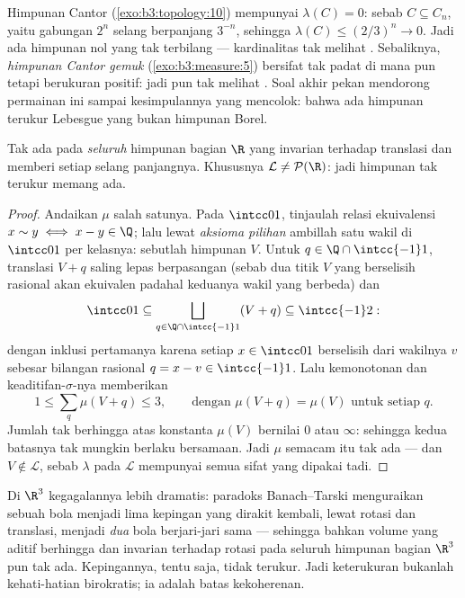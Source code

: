 \begin{example}\label{ex:b3:measure:cantor}
Himpunan Cantor (\cref{exo:b3:topology:10}) mempunyai $\lambda(C) = 0$:
sebab $C \subseteq C_n$, yaitu gabungan $2^n$ selang berpanjang
$3^{-n}$, sehingga $\lambda(C) \leq (2/3)^n \to 0$. Jadi ada himpunan nol
yang tak terbilang --- kardinalitas tak melihat . Sebaliknya,
\emph{himpunan Cantor gemuk} (\cref{exo:b3:measure:5}) bersifat tak padat
di mana pun tetapi berukuran positif: jadi  pun tak melihat .
Soal akhir pekan mendorong permainan ini sampai kesimpulannya yang
mencolok: bahwa ada himpunan terukur Lebesgue yang
bukan himpunan Borel.
\end{example}

\begin{theorem}[Vitali]\label{thm:b3:measure:vitali}
Tak ada  pada \emph{seluruh} himpunan bagian $\R$ yang
invarian terhadap translasi dan memberi setiap selang panjangnya.
Khususnya $\mathcal L \neq \mathcal P(\R)$: jadi himpunan tak terukur
memang ada.
\end{theorem}

\begin{proof}
Andaikan $\mu$ salah satunya. Pada $\intcc01$, tinjaulah relasi ekuivalensi
$x \sim y \iff x - y \in \Q$; lalu lewat \emph{aksioma pilihan}
ambillah satu wakil di $\intcc01$ per kelasnya: sebutlah himpunan $V$. Untuk
$q \in \Q\cap\intcc{-1}1$, translasi $V + q$ saling lepas
berpasangan (sebab dua titik $V$ yang berselisih rasional akan
ekuivalen padahal keduanya wakil yang berbeda) dan
\[
\intcc01 \subseteq \bigsqcup_{q \in \Q\cap\intcc{-1}1}(V + q)
\subseteq \intcc{-1}2 :
\]
dengan inklusi pertamanya karena setiap $x \in \intcc01$ berselisih dari
wakilnya $v$ sebesar bilangan rasional $q = x - v \in
\intcc{-1}1$. Lalu kemonotonan dan keaditifan-$\sigma$-nya memberikan
\[
1 \leq \sum_{q}\mu(V + q) \leq 3,
\qquad\text{dengan } \mu(V + q) = \mu(V) \text{ untuk setiap } q .
\]
Jumlah tak berhingga atas konstanta $\mu(V)$ bernilai $0$ atau $\infty$:
sehingga kedua batasnya tak mungkin berlaku bersamaan. Jadi $\mu$ semacam itu tak ada --- dan $V
\notin \mathcal L$, sebab $\lambda$ pada $\mathcal L$ mempunyai semua
sifat yang dipakai tadi.
\end{proof}

\begin{remark}\label{rem:b3:measure:banachtarski}
Di $\R^3$ kegagalannya lebih dramatis: paradoks Banach--Tarski
menguraikan sebuah bola menjadi lima kepingan yang dirakit kembali, lewat
rotasi dan translasi, menjadi \emph{dua} bola berjari-jari
sama --- sehingga bahkan volume yang aditif berhingga dan invarian terhadap rotasi
pada seluruh himpunan bagian $\R^3$ pun tak ada. Kepingannya, tentu saja,
tidak terukur. Jadi keterukuran bukanlah kehati-hatian
birokratis; ia adalah batas kekoherenan.
\end{remark}

